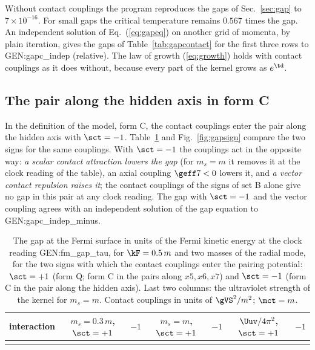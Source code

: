 Without contact couplings the program reproduces the gaps of Sec.~\ref{sec:gap} to $7\times10^{-16}$.
For small gaps the critical temperature remains $0.567$ times the gap. An independent solution of
Eq.~(\ref{eq:gapeq}) on another grid of momenta, by plain iteration, gives the gaps of
Table~\ref{tab:gapcontact} for the first three rows to {{GEN:gapc_indep}} (relative). The law of growth
(\ref{eq:growth}) holds with contact couplings as it does without, because every part of the kernel
grows as $e^{\td}$.

\subsection{The pair along the hidden axis in form C}
\label{sec:gapformc}

In the definition of the model, form C, the contact couplings enter the pair along the hidden axis
with $\sct=-1$. Table~\ref{tab:gapsign} and Fig.~\ref{fig:gapsign} compare the two signs for the same
couplings. With $\sct=-1$ the couplings act in the opposite way: \emph{a scalar contact attraction
lowers the gap} (for $m_s=m$ it removes it at the clock reading of the table), an axial coupling
$\geff7<0$ lowers it, and \emph{a vector contact repulsion raises it}; the contact couplings of the
signs of set B alone give no gap in this pair at any clock reading. The gap with $\sct=-1$ and the
vector coupling agrees with an independent solution of the gap equation to {{GEN:gapc_indep_minus}}.

\begin{table}
\caption{\label{tab:gapsign}The gap at the Fermi surface in units of the Fermi kinetic energy at the
clock reading {{GEN:fm_gap_tau}}, for $\kF=0.5\,m$ and two masses of the radial mode, for the two
signs with which the contact couplings enter the pairing potential: $\sct=+1$ (form Q; form C in the
pairs along $x5,x6,x7$) and $\sct=-1$ (form C in the pair along the hidden axis). Last two columns:
the ultraviolet strength of the kernel for $m_s=m$. Contact couplings in units of $\gVS^{2}/m^{2}$;
$\mct=m$.}
\begin{ruledtabular}
\begin{tabular}{>{\raggedright\arraybackslash}p{}cccccc}
interaction & $m_s=0.3\,m$, $\sct=+1$ & $-1$ & $m_s=m$, $\sct=+1$ & $-1$ & $\Uuv/4\pi^{2}$, $\sct=+1$ & $-1$ \\
\hline
{{ROWS:tbl_fm_gap}}
\end{tabular}
\end{ruledtabular}
\end{table}


